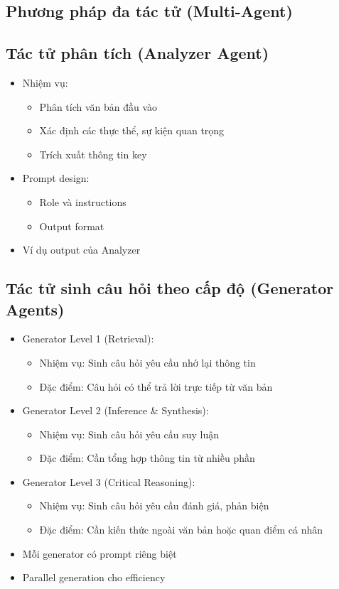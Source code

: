 \subsection{Phương pháp đa tác tử (Multi-Agent)}
\begin{itemize}

\subsection{Tác tử phân tích (Analyzer Agent)}
\begin{itemize}
    \item Nhiệm vụ:
    \begin{itemize}
        \item Phân tích văn bản đầu vào
        \item Xác định các thực thể, sự kiện quan trọng
        \item Trích xuất thông tin key
    \end{itemize}
    \item Prompt design:
    \begin{itemize}
        \item Role và instructions
        \item Output format
    \end{itemize}
    \item Ví dụ output của Analyzer
\end{itemize}

\subsection{Tác tử sinh câu hỏi theo cấp độ (Generator Agents)}
\begin{itemize}
    \item Generator Level 1 (Retrieval):
    \begin{itemize}
        \item Nhiệm vụ: Sinh câu hỏi yêu cầu nhớ lại thông tin
        \item Đặc điểm: Câu hỏi có thể trả lời trực tiếp từ văn bản
    \end{itemize}
    \item Generator Level 2 (Inference \& Synthesis):
    \begin{itemize}
        \item Nhiệm vụ: Sinh câu hỏi yêu cầu suy luận
        \item Đặc điểm: Cần tổng hợp thông tin từ nhiều phần
    \end{itemize}
    \item Generator Level 3 (Critical Reasoning):
    \begin{itemize}
        \item Nhiệm vụ: Sinh câu hỏi yêu cầu đánh giá, phản biện
        \item Đặc điểm: Cần kiến thức ngoài văn bản hoặc quan điểm cá nhân
    \end{itemize}
    \item Mỗi generator có prompt riêng biệt
    \item Parallel generation cho efficiency
\end{itemize}


\end{itemize}
